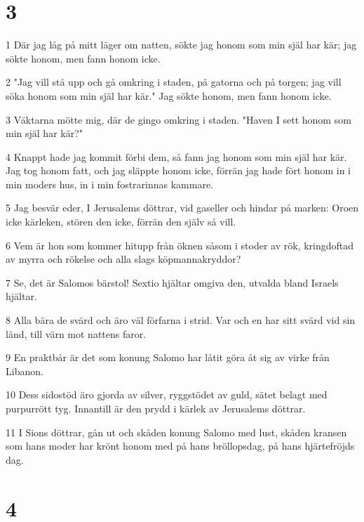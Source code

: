 \chapter{3}

\par 1 Där jag låg på mitt läger om natten, sökte jag honom som min själ har kär; jag sökte honom, men fann honom icke.
\par 2 "Jag vill stå upp och gå omkring i staden, på gatorna och på torgen; jag vill söka honom som min själ har kär." Jag sökte honom, men fann honom icke.
\par 3 Väktarna mötte mig, där de gingo omkring i staden. "Haven I sett honom som min själ har kär?"
\par 4 Knappt hade jag kommit förbi dem, så fann jag honom som min själ har kär. Jag tog honom fatt, och jag släppte honom icke, förrän jag hade fört honom in i min moders hus, in i min fostrarinnas kammare.
\par 5 Jag besvär eder, I Jerusalems döttrar, vid gaseller och hindar på marken: Oroen icke kärleken, stören den icke, förrän den själv så vill.
\par 6 Vem är hon som kommer hitupp från öknen såsom i stoder av rök, kringdoftad av myrra och rökelse och alla slags köpmannakryddor?
\par 7 Se, det är Salomos bärstol! Sextio hjältar omgiva den, utvalda bland Israels hjältar.
\par 8 Alla bära de svärd och äro väl förfarna i strid. Var och en har sitt svärd vid sin länd, till värn mot nattens faror.
\par 9 En praktbår är det som konung Salomo har låtit göra åt sig av virke från Libanon.
\par 10 Dess sidostöd äro gjorda av silver, ryggstödet av guld, sätet belagt med purpurrött tyg. Innantill är den prydd i kärlek av Jerusalems döttrar.
\par 11 I Sions döttrar, gån ut och skåden konung Salomo med lust, skåden kransen som hans moder har krönt honom med på hans bröllopsdag, på hans hjärtefröjds dag.

\chapter{4}

